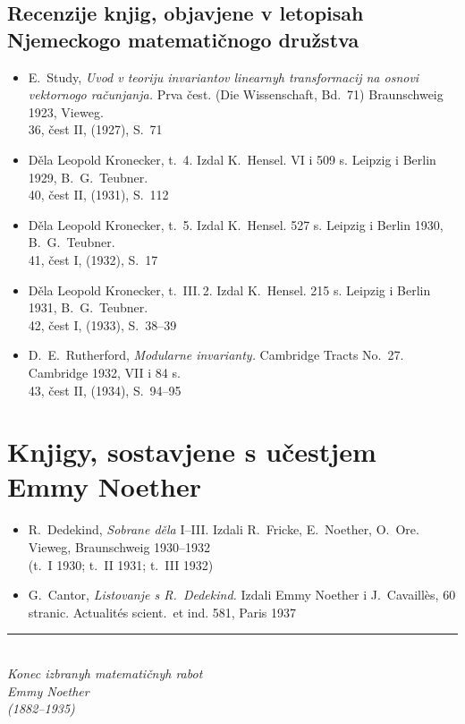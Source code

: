 \documentclass[11pt]{article}
\newcommand{\foreign}[1]{#1}
\begin{document}
\subsection*{Recenzije knjig, objavjene v letopisah Njemeckogo matematičnogo družstva}

\begin{itemize}[leftmargin=1.5em,itemsep=0.2em]
\item E.\ Study, \textit{Uvod v teoriju invariantov linearnyh transformacij na osnovi vektornogo računjanja.} Prva čest. (\foreign{Die Wissenschaft}, Bd.~71) Braunschweig 1923, Vieweg.\\
36, čest II, (1927), S.~71

\item Děla Leopold Kronecker, t.~4. Izdal K.\ Hensel. VI i 509 s. Leipzig i Berlin 1929, B.\ G.\ Teubner.\\
40, čest II, (1931), S.~112

\item Děla Leopold Kronecker, t.~5. Izdal K.\ Hensel. 527 s. Leipzig i Berlin 1930, B.\ G.\ Teubner.\\
41, čest I, (1932), S.~17

\item Děla Leopold Kronecker, t.~III.\,2. Izdal K.\ Hensel. 215 s. Leipzig i Berlin 1931, B.\ G.\ Teubner.\\
42, čest I, (1933), S.~38--39

\item D.\ E.\ Rutherford, \textit{Modularne invarianty.} \foreign{Cambridge Tracts No.~27.} Cambridge 1932, VII i 84 s.\\
43, čest II, (1934), S.~94--95
\end{itemize}

\newpage
\section*{Knjigy, sostavjene s učestjem Emmy Noether}

\begin{itemize}[leftmargin=1.5em,itemsep=0.5em]
\item R.\ Dedekind, \textit{Sobrane děla} I--III. Izdali R.\ Fricke, E.\ Noether, O.\ Ore. Vieweg, Braunschweig 1930--1932\\
(t.~I 1930; t.~II 1931; t.~III 1932)

\item G.\ Cantor, \textit{Listovanje s R.\ Dedekind.} Izdali Emmy Noether i J.\ Cavaillès, 60 stranic. \foreign{Actualités scient.\ et ind.} 581, Paris 1937
\end{itemize}

\vfill

\begin{center}
\rule{0.5\textwidth}{0.4pt}\\[1em]
\textit{Konec izbranyh matematičnyh rabot}\\[0.5em]
\textit{Emmy Noether}\\[0.5em]
\textit{(1882--1935)}
\end{center}
\end{document}
